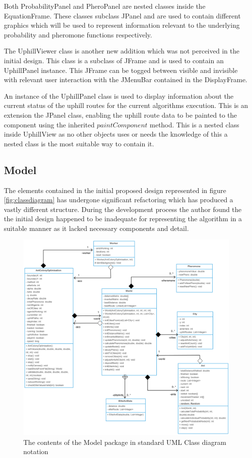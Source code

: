 Both ProbabilityPanel and PheroPanel are nested classes inside the EquationFrame. These classes subclass JPanel and are used to contain different graphics which will be used to represent information relevant to the underlying probability and pheromone functions respectively.

The UphillViewer class is another new addition which was not perceived in the initial design. This class is a subclass of JFrame and is used to contain an UphillPanel instance. This JFrame can be togged between visible and invisible with relevant user interaction with the JMenuBar contained in the DisplayFrame.

An instance of the UphillPanel class is used to display information about the current status of the uphill routes for the current algorithms execution. This is an extension the JPanel class, enabling the uphill route data to be painted to the component using the inherited $paintComponent$ method. This is a nested class inside UphillView as no other objects uses or needs the knowledge of this a nested class is the most suitable way to contain it.

\subsection{Model}

The elements contained in the initial proposed design represented in figure \ref{fig:classdiagram} has undergone significant refactoring which has produced a vastly different structure. During the development process the author found the the initial design happened to be inadequate for representing the algorithm in a suitable manner as it lacked necessary components and detail.

\clearpage
\begin{figure}
\includegraphics[scale=0.22]{Images/chapter4/model}
\caption[Model Package Class Diagram]{The contents of the Model package in standard UML Class diagram notation}
\label{fig:classdiagramImp}
\end{figure}
\clearpage

